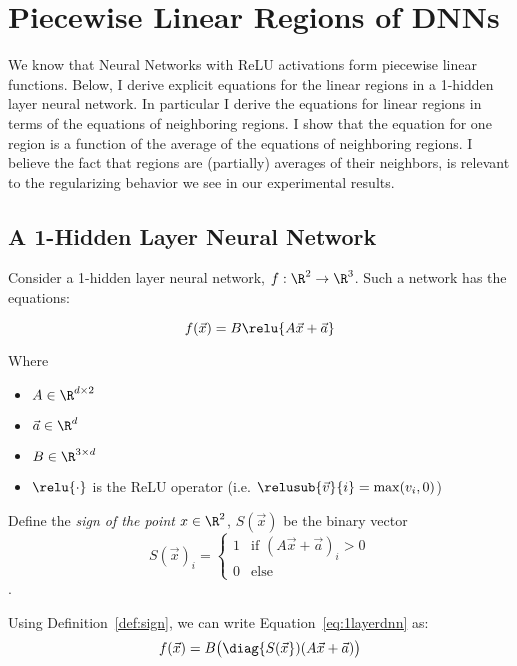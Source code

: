 \section{Piecewise Linear Regions of DNNs}
We know that Neural Networks with ReLU activations form piecewise linear functions. Below, I derive explicit equations for the linear regions in a 1-hidden layer neural network. In particular I derive the equations for linear regions in terms of the equations of neighboring regions. I show that the equation for one region is a function of the average of the equations of neighboring regions. I believe the fact that regions are (partially) averages of their neighbors, is relevant to the regularizing behavior we see in our experimental results. 

\subsection{A 1-Hidden Layer Neural Network}
Consider a 1-hidden layer neural network, $f: \R^2 \rightarrow \R^3$. Such a network has the equations:

\begin{equation}\label{eq:1layerdnn}
    f(\vec{x}) = B \relu{A\vec{x} + \vec{a}}
\end{equation}

\noindent
Where 
\begin{itemize}
    \item $A \in \R^{d \times 2}$
    \item $\vec{a} \in \R^d$
    \item  $B \in \R^{3 \times d}$
    \item $\relu{\cdot}$ is the ReLU operator (i.e. $\relusub{\vec{v}}{i} = \max(v_i, 0)$)
\end{itemize}

\begin{definition}\label{def:sign}
Define the \emph{sign of the point} $x \in \R^2$, $S(\vec{x})$ be the binary vector 
$$S(\vec{x})_i = \begin{cases} 1 & \text{if } (A \vec{x} + \vec{a})_i > 0\\ 0 & \text{else} \end{cases}$$. 
\end{definition}

Using Definition~\ref{def:sign}, we can write Equation~\ref{eq:1layerdnn} as:
\begin{equation}\label{eq:1layerdnn_s}
    f(\vec{x}) = B \big(\diag{S(\vec{x}})(A\vec{x} + \vec{a})\big)
\end{equation}

